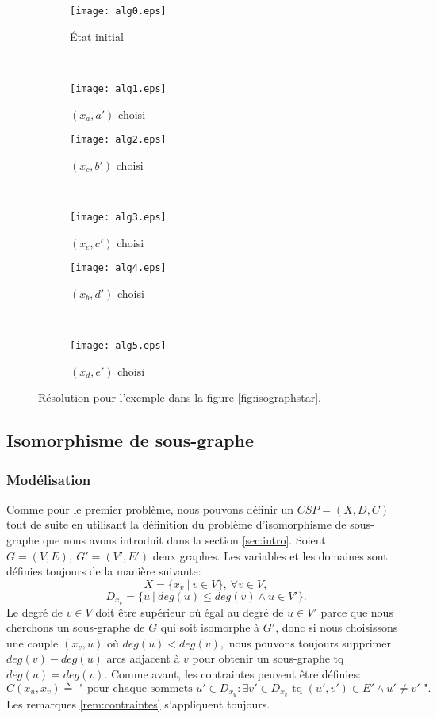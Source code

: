 \documentclass[french]{article}
\theoremstyle{definition}
\theoremstyle{remark}
\begin{document}
\begin{figure*}[t!]
	\begin{subfigure}[t]{0.5\textwidth}
		\centering
		\texttt{[image: alg0.eps]}
		\caption{État initial}
	\end{subfigure}%
	~
	\begin{subfigure}[t]{0.5\textwidth}
		\centering
		\texttt{[image: alg1.eps]}
		\caption{$(x_a, a')$ choisi}
	\end{subfigure}
	
	\begin{subfigure}[t]{0.5\textwidth}
		\centering
		\texttt{[image: alg2.eps]}
		\caption{$(x_c, b')$ choisi}
	\end{subfigure}
	~
	\begin{subfigure}[t]{0.5\textwidth}
		\centering
		\texttt{[image: alg3.eps]}
		\caption{$(x_e, c')$ choisi}
	\end{subfigure}
	
	\begin{subfigure}[t]{0.5\textwidth}
		\centering
		\texttt{[image: alg4.eps]}
		\caption{$(x_b, d')$ choisi}
	\end{subfigure}
	~
	\begin{subfigure}[t]{0.5\textwidth}
		\centering
		\texttt{[image: alg5.eps]}
		\caption{$(x_d, e')$ choisi}
	\end{subfigure}
	\caption{\label{fig:algstar} Résolution pour l'exemple dans la figure \ref{fig:isographstar}.}
\end{figure*}




\newpage
\subsection{Isomorphisme de sous-graphe}
\subsubsection{Modélisation}
Comme pour le premier problème, nous pouvons définir un $CSP=(X, D, C)$ tout de suite en utilisant la définition du problème d'isomorphisme de sous-graphe que nous avons introduit dans la section 
\ref{sec:intro}. Soient $G=(V, E),\ G'=(V', E')$ deux graphes. Les variables et les domaines sont définies toujours de la manière suivante:
$$X=\{x_v\ |\ v \in V \},\ \forall v \in V,$$
$$D_{x_v}=\{u\ |\ deg(u) \leq deg(v) \land u \in V'\}.$$
Le degré de $v \in V$ doit être supérieur où égal au degré de $u \in V'$ parce que nous cherchons un sous-graphe de $G$ qui soit isomorphe à $G'$, donc si nous choisissons une couple $(x_v, u)$ où $deg(u) < deg(v),$ nous pouvons toujours supprimer $deg(v) - deg(u)$ arcs adjacent à $v$ pour obtenir un sous-graphe tq $deg(u) = deg(v).$
Comme avant, les contraintes peuvent être définies:
$$C(x_u, x_v) \triangleq \text{ " pour chaque sommets } u' \in D_{x_u}: \exists v' \in D_{x_v} \text{ tq } (u', v') \in E' \land u' \neq v' \text{ "}.$$
Les remarques \ref{rem:contraintes} s'appliquent toujours.
\end{document}
